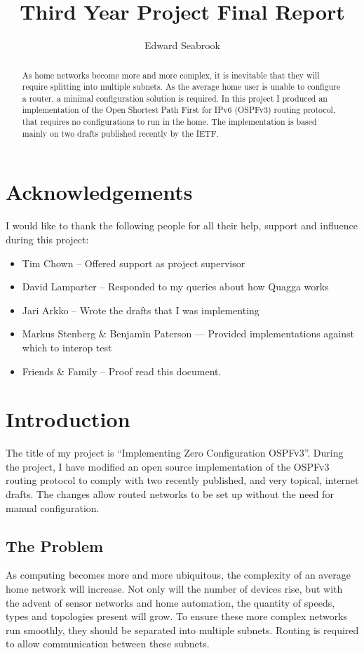 \documentclass[12pt,a4paper,twoside]{report}
\author{Edward Seabrook}
\title{Third Year Project Final Report}
\begin{document}


\begin{abstract}
As home networks become more and more complex, it is inevitable that they will
require splitting into multiple subnets. As the average home user is unable to
configure a router, a minimal configuration solution is required. In this
project I produced an implementation of the Open Shortest Path First for IPv6
(OSPFv3) routing protocol, that requires no configurations to run in the home.
The implementation is based mainly on two drafts published recently by the
IETF\@{}. 
\end{abstract}

\tableofcontents
\clearpage

\chapter*{Acknowledgements}
I would like to thank the following people for all their help, support and
influence during this project:
\begin{itemize}
\item Tim Chown -- Offered support as project supervisor
\item David Lamparter -- Responded to my queries about how Quagga works
\item Jari Arkko -- Wrote the drafts that I was implementing
\item Markus Stenberg \& Benjamin Paterson --- Provided implementations against which 
      to interop test
\item Friends \& Family -- Proof read this document.
\end{itemize}

\chapter{Introduction}
The title of my project is ``Implementing Zero Configuration OSPFv3''. During
the project, I have modified an open source implementation of the OSPFv3
routing protocol to comply with two recently published, and very topical,
internet drafts. The changes allow routed networks to be set up without the
need for manual configuration.

\section{The Problem}
As computing becomes more and more ubiquitous, the complexity of an average home
network will increase. Not only will the number of devices rise, but with the
advent of sensor networks and home automation, the quantity of speeds,
types and topologies present will grow. To ensure these more complex networks
run smoothly, they should be separated into multiple subnets. Routing is
required to allow communication between these subnets. 
\end{document}
